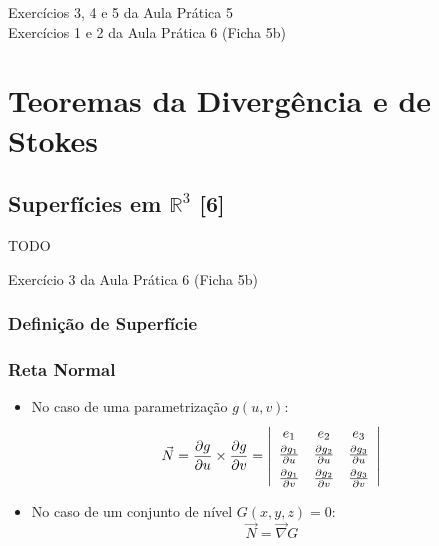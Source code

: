 \documentclass[11pt, a4paper]{article}
\begin{document}
Exercícios 3, 4 e 5 da Aula Prática 5 \\
Exercícios 1 e 2 da Aula Prática 6 (Ficha 5b)

\newpage


\section{Teoremas da Divergência e de Stokes}

\subsection{Superfícies em $\mathbb{R}^3$ [6]}

TODO

Exercício 3 da Aula Prática 6 (Ficha 5b)

\subsubsection{Definição de Superfície}

\subsubsection{Reta Normal}

\begin{itemize}
    \item No caso de uma parametrização $g(u,v)$:
          \begin{equation*}
              \vec{N} = \frac{\partial g}{\partial u} \times \frac{\partial g}{\partial v}
              = \left\vert
              \begin{array}{c c c}
                  e_1                             & e_2 & e_3 \\[2pt]
                  \frac{\partial g_1}{\partial u} &
                  \frac{\partial g_2}{\partial u} &
                  \frac{\partial g_3}{\partial u}             \\[4pt]
                  \frac{\partial g_1}{\partial v} &
                  \frac{\partial g_2}{\partial v} &
                  \frac{\partial g_3}{\partial v}
              \end{array}
              \right\vert
          \end{equation*}
    \item No caso de um conjunto de nível $G(x, y, z) = 0$:
          \begin{equation*}
              \vec{N} = \vec{\nabla} G
          \end{equation*}
\end{itemize}
\end{document}
